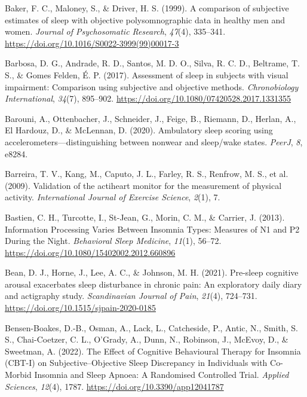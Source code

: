 \documentclass[
]{article}
\newlength{\cslhangindent}
\newenvironment{CSLReferences}[2] %
 {\begin{list}{}{%
  \setlength{\itemindent}{0pt}
  \setlength{\leftmargin}{0pt}
  \setlength{\parsep}{0pt}
  \ifodd #1
   \setlength{\leftmargin}{\cslhangindent}
   \setlength{\itemindent}{-1\cslhangindent}
  \fi
  \setlength{\itemsep}{#2\baselineskip}}}
 {\end{list}}
\begin{document}
\begin{CSLReferences}{1}{0}
Baker, F. C., Maloney, S., \& Driver, H. S. (1999). A comparison of subjective estimates of sleep with objective polysomnographic data in healthy men and women. \emph{Journal of Psychosomatic Research}, \emph{47}(4), 335--341. \url{https://doi.org/10.1016/S0022-3999(99)00017-3}

Barbosa, D. G., Andrade, R. D., Santos, M. D. O., Silva, R. C. D., Beltrame, T. S., \& Gomes Felden, É. P. (2017). Assessment of sleep in subjects with visual impairment: {Comparison} using subjective and objective methods. \emph{Chronobiology International}, \emph{34}(7), 895--902. \url{https://doi.org/10.1080/07420528.2017.1331355}

Barouni, A., Ottenbacher, J., Schneider, J., Feige, B., Riemann, D., Herlan, A., El Hardouz, D., \& McLennan, D. (2020). Ambulatory sleep scoring using accelerometers---distinguishing between nonwear and sleep/wake states. \emph{PeerJ}, \emph{8}, e8284.

Barreira, T. V., Kang, M., Caputo, J. L., Farley, R. S., Renfrow, M. S., et al. (2009). Validation of the actiheart monitor for the measurement of physical activity. \emph{International Journal of Exercise Science}, \emph{2}(1), 7.

Bastien, C. H., Turcotte, I., St-Jean, G., Morin, C. M., \& Carrier, J. (2013). Information {Processing} {Varies} {Between} {Insomnia} {Types}: {Measures} of {N1} and {P2} {During} the {Night}. \emph{Behavioral Sleep Medicine}, \emph{11}(1), 56--72. \url{https://doi.org/10.1080/15402002.2012.660896}

Bean, D. J., Horne, J., Lee, A. C., \& Johnson, M. H. (2021). Pre-sleep cognitive arousal exacerbates sleep disturbance in chronic pain: An exploratory daily diary and actigraphy study. \emph{Scandinavian Journal of Pain}, \emph{21}(4), 724--731. \url{https://doi.org/10.1515/sjpain-2020-0185}

Bensen-Boakes, D.-B., Osman, A., Lack, L., Catcheside, P., Antic, N., Smith, S. S., Chai-Coetzer, C. L., O'Grady, A., Dunn, N., Robinson, J., McEvoy, D., \& Sweetman, A. (2022). The {Effect} of {Cognitive} {Behavioural} {Therapy} for {Insomnia} ({CBT}-{I}) on {Subjective}--{Objective} {Sleep} {Discrepancy} in {Individuals} with {Co}-{Morbid} {Insomnia} and {Sleep} {Apnoea}: {A} {Randomised} {Controlled} {Trial}. \emph{Applied Sciences}, \emph{12}(4), 1787. \url{https://doi.org/10.3390/app12041787}


\end{CSLReferences}
\end{document}
